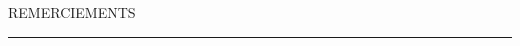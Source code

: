 \begin{center}
\MakeUppercase{\LARGE{R}\Large{emerciements}} \\
\noindent\rule{17cm}{0.4pt}
\end{center}